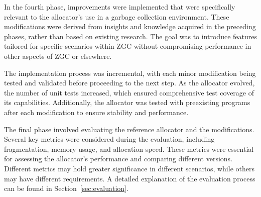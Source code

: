 In the fourth phase, improvements were implemented that were specifically relevant to the allocator's use in a garbage collection environment. These modifications were derived from insights and knowledge acquired in the preceding phases, rather than based on existing research. The goal was to introduce features tailored for specific scenarios within ZGC without compromising performance in other aspects of ZGC or elsewhere.

The implementation process was incremental, with each minor modification being tested and validated before proceeding to the next step. As the allocator evolved, the number of unit tests increased, which ensured comprehensive test coverage of its capabilities. Additionally, the allocator was tested with preexisting programs after each modification to ensure stability and performance.

The final phase involved evaluating the reference allocator and the modifications. Several key metrics were considered during the evaluation, including fragmentation, memory usage, and allocation speed. These metrics were essential for assessing the allocator's performance and comparing different versions. Different metrics may hold greater significance in different scenarios, while others may have different requirements. A detailed explanation of the evaluation process can be found in Section~\ref{sec:evaluation}.

